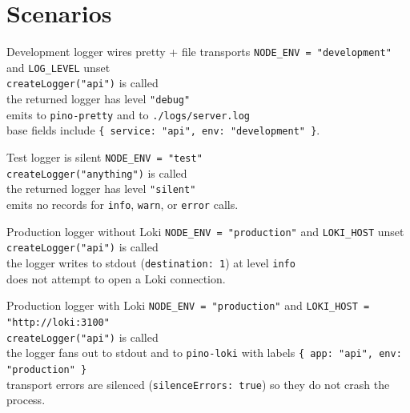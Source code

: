 \section{Scenarios}

\begin{scenario}{Development logger wires pretty + file transports}
\Given \texttt{NODE\_ENV = "development"} and \texttt{LOG\_LEVEL} unset \\
\When \texttt{createLogger("api")} is called \\
\Then the returned logger has level \texttt{"debug"} \\
\And emits to \texttt{pino-pretty} and to \texttt{./logs/server.log} \\
\And base fields include \texttt{\{ service: "api", env: "development" \}}.
\end{scenario}

\begin{scenario}{Test logger is silent}
\Given \texttt{NODE\_ENV = "test"} \\
\When \texttt{createLogger("anything")} is called \\
\Then the returned logger has level \texttt{"silent"} \\
\And emits no records for \texttt{info}, \texttt{warn}, or \texttt{error} calls.
\end{scenario}

\begin{scenario}{Production logger without Loki}
\Given \texttt{NODE\_ENV = "production"} and \texttt{LOKI\_HOST} unset \\
\When \texttt{createLogger("api")} is called \\
\Then the logger writes to stdout (\texttt{destination: 1}) at level \texttt{info} \\
\And does not attempt to open a Loki connection.
\end{scenario}

\begin{scenario}{Production logger with Loki}
\Given \texttt{NODE\_ENV = "production"} and \texttt{LOKI\_HOST = "http://loki:3100"} \\
\When \texttt{createLogger("api")} is called \\
\Then the logger fans out to stdout and to \texttt{pino-loki} with labels \texttt{\{ app: "api", env: "production" \}} \\
\And transport errors are silenced (\texttt{silenceErrors: true}) so they do not crash the process.
\end{scenario}


